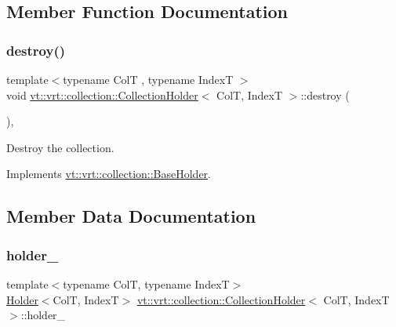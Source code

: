 \subsection{Member Function Documentation}
\mbox{\label{structvt_1_1vrt_1_1collection_1_1_collection_holder_a744d2a48f9f22db59b2705b3d3f3d1ca}} 
\subsubsection{\texorpdfstring{destroy()}{destroy()}}
{\footnotesize\ttfamily template$<$typename ColT , typename IndexT $>$ \\
void \hyperlink{structvt_1_1vrt_1_1collection_1_1_collection_holder}{vt\+::vrt\+::collection\+::\+Collection\+Holder}$<$ ColT, IndexT $>$\+::destroy (\begin{DoxyParamCaption}{ }\end{DoxyParamCaption})\hspace{0.3cm}{\ttfamily [override]}, {\ttfamily [virtual]}}



Destroy the collection. 



Implements \hyperlink{structvt_1_1vrt_1_1collection_1_1_base_holder_a56c8289f60121e38f3699bcfafbbd491}{vt\+::vrt\+::collection\+::\+Base\+Holder}.



\subsection{Member Data Documentation}
\mbox{\label{structvt_1_1vrt_1_1collection_1_1_collection_holder_a509a3abe1ab350cc1d108030977ab0e9}} 
\subsubsection{\texorpdfstring{holder\+\_\+}{holder\_}}
{\footnotesize\ttfamily template$<$typename ColT, typename IndexT$>$ \\
\hyperlink{structvt_1_1vrt_1_1collection_1_1_holder}{Holder}$<$ColT, IndexT$>$ \hyperlink{structvt_1_1vrt_1_1collection_1_1_collection_holder}{vt\+::vrt\+::collection\+::\+Collection\+Holder}$<$ ColT, IndexT $>$\+::holder\+\_\+}

